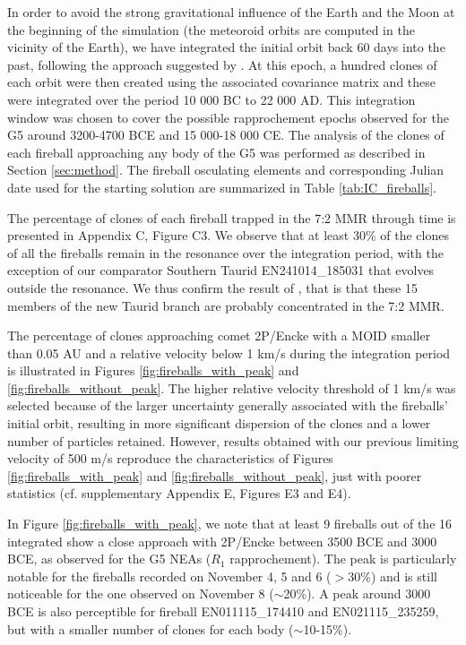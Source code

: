 \documentclass[letters,a4paper,fleqn,usenatbib]{mnras}
\begin{document}
 In order to avoid the strong gravitational influence of the Earth and the Moon at the beginning of the simulation (the meteoroid orbits are computed in the vicinity of the Earth), we have integrated the initial orbit back 60 days into the past, following the approach suggested by \cite{Clark2011}. At this epoch, a hundred clones of each orbit were then created using the associated covariance matrix and these were integrated over the period 10 000 BC to 22 000 AD. This integration window was chosen to cover the possible rapprochement epochs observed for the G5 around 3200-4700 BCE and 15 000-18 000 CE. The analysis of the clones of each fireball approaching any body of the G5 was performed as described in Section \ref{sec:method}. The fireball osculating elements and corresponding Julian date used for the starting solution are summarized in Table \ref{tab:IC_fireballs}. 
 
 The percentage of clones of each fireball trapped in the 7:2 MMR through time is presented in Appendix C, Figure C3. We observe that at least 30\% of the clones of all the fireballs remain in the resonance over the integration period, with the exception of our comparator Southern Taurid EN241014\_185031 that evolves outside the resonance. We thus confirm the result of \cite{Spurny2017}, that is that these 15 members of the new Taurid branch are probably concentrated in the 7:2 MMR. 
 
 The percentage of clones approaching comet 2P/Encke with a MOID smaller than 0.05 AU and a relative velocity below 1 km/s during the integration period is illustrated in Figures \ref{fig:fireballs_with_peak} and \ref{fig:fireballs_without_peak}. The higher relative velocity threshold of 1 km/s was selected because of the  larger uncertainty generally associated with the fireballs' initial orbit, resulting in more significant dispersion of the clones and a lower number of particles retained. However, results obtained with our previous limiting velocity of 500 m/s reproduce the characteristics of Figures \ref{fig:fireballs_with_peak} and \ref{fig:fireballs_without_peak}, just with poorer statistics (cf. supplementary Appendix E, Figures E3 and E4). 
 
 

 
 In Figure \ref{fig:fireballs_with_peak}, we note that at least 9 fireballs out of the 16 integrated show a close approach with 2P/Encke between 3500 BCE and 3000 BCE, as observed for the G5 NEAs ($R_1$ rapprochement). The peak is particularly notable for the fireballs recorded on November 4, 5 and 6 ($>$30\%) and is still noticeable for the one observed on November 8 ($\sim$20\%). A peak around 3000 BCE is also perceptible for fireball EN011115\_174410 and EN021115\_235259, but with a smaller number of clones for each body ($\sim$10-15\%). 
 
\end{document}
